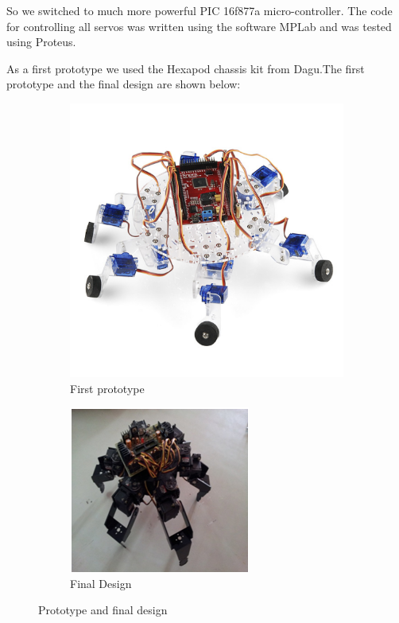 \documentclass{report}
\begin{document}
So we switched to much more powerful PIC 16f877a micro-controller. The code for controlling all servos was written using the software MPLab and was tested using Proteus. 

As a first prototype we used the Hexapod chassis kit from Dagu.The first prototype and the final design are shown below:
\begin{figure}[h!]

\begin{subfigure}{0.5\textwidth}
\centering
\includegraphics[scale=0.12]{dagufull}
\caption{First prototype}
\end{subfigure}%
\begin{subfigure}{0.5\textwidth}
\centering
\includegraphics[scale=1]{final}
\caption{Final Design}
\end{subfigure}%
\caption{Prototype and final design}
\label{fig215}
\end{figure}
\FloatBarrier
\end{document}
